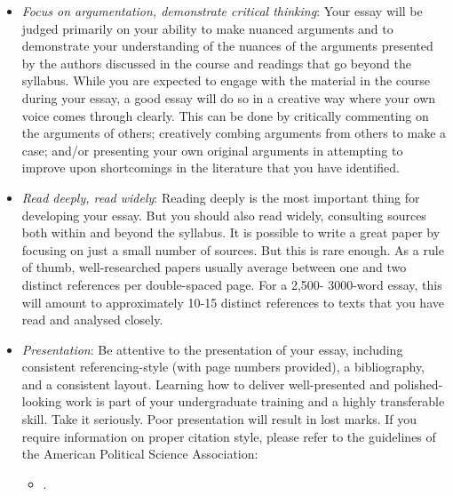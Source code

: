 \documentclass[abstract=on,parskip=full,headings=standardclasses,fontsize=11pt,paper=a4]{scrartcl}
\begin{document}
\begin{itemize}
\begin{itemize}
\item \textit{Focus on argumentation, demonstrate critical thinking}: Your essay will be judged primarily on your ability to make nuanced arguments and to demonstrate your understanding of the nuances of the arguments presented by the authors discussed in the course and readings that go beyond the syllabus. While you are expected to engage with the material in the course during your essay, a good essay will do so in a creative way where your own voice comes through clearly. This can be done by critically commenting on the arguments of others; creatively combing arguments from others to make a case; and/or presenting your own original arguments in attempting to improve upon shortcomings in the literature that you have identified.
\item \textit{Read deeply, read widely}: Reading deeply is the most important thing for developing your essay. But you should also read widely, consulting sources both within and beyond the syllabus. It is possible to write a great paper by focusing on just a small number of sources. But this is rare enough. As a rule of thumb, well-researched papers usually average between one and two distinct references per double-spaced page. For a 2,500- 3000-word essay, this will amount to approximately 10-15 distinct references to texts that you have read and analysed closely.
\item \textit{Presentation}: Be attentive to the presentation of your essay, including consistent referencing-style (with page numbers provided), a bibliography, and  a consistent layout. Learning how to deliver well-presented and polished-looking work is part of your undergraduate training and a highly transferable skill. Take it seriously. Poor presentation will result in lost marks. If you require information on proper citation style, please refer to the guidelines of the American Political Science Association: 
\begin{itemize}
\item {}.
\end{itemize}
\end{itemize}



\end{itemize}

\end{document}

